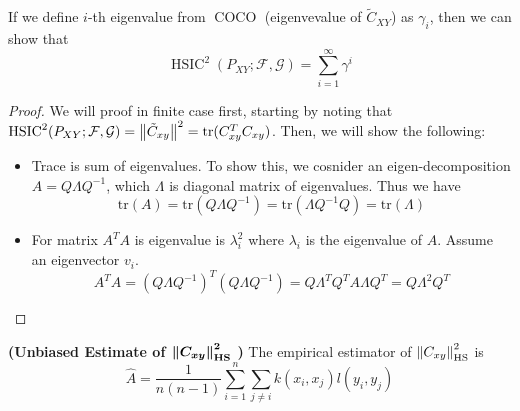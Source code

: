 \begin{proposition}
    If we define $i$-th eigenvalue from $\operatorname{COCO}$ (eigenvevalue of $\tilde{C}_{XY}$) as $\gamma_i$, then we can show that 
    \begin{equation*}
        \operatorname{HSIC}^2(P_{XY};\mathcal{F}, \mathcal{G}) = \sum^\infty_{i=1} \gamma^i
    \end{equation*}
\end{proposition}
\begin{proof}
    We will proof in finite case first, starting by noting that $\operatorname{HSIC}^2(P_{XY};\mathcal{F}, \mathcal{G}) = \left\lVert\tilde{C}_{xy}\right\rVert^2 = \text{tr}(C_{xy}^TC_{xy})$. Then, we will show the following:
    \begin{itemize}
        \item Trace is sum of eigenvalues. To show this, we cosnider an eigen-decomposition $A = Q\Lambda Q^{-1}$, which $\Lambda$ is diagonal matrix of eigenvalues. Thus we have 
        \begin{equation*}
            \text{tr}(A) = \text{tr}(Q\Lambda Q^{-1}) = \text{tr}(\Lambda Q^{-1}Q) = \text{tr}(\Lambda)    
        \end{equation*}
        \item For matrix $A^TA$ is eigenvalue is $\lambda_i^2$ where $\lambda_i$ is the eigenvalue of $A$. Assume an eigenvector $v_i$.
        \begin{equation*}
            A^TA = (Q\Lambda Q^{-1})^T(Q\Lambda Q^{-1}) = Q\Lambda^TQ^TA\Lambda Q^T = Q\Lambda^2Q^T
        \end{equation*}
    \end{itemize}
\end{proof}

\begin{definition}{\textbf{(Unbiased Estimate of $\boldsymbol{\left\lVert C_{xy}\right\rVert^2_{\operatorname{HS}}}$ )}}
    \label{def:unbias-C-norm}
    The empirical estimator of $\left\lVert C_{xy}\right\rVert^2_{\operatorname{HS}}$ is
    \begin{equation*}
        \hat{A} = \frac{1}{n(n-1)}\sum^n_{i=1}\sum_{j\ne i} k(x_i, x_j)l(y_i, y_j)
    \end{equation*}
\end{definition}

